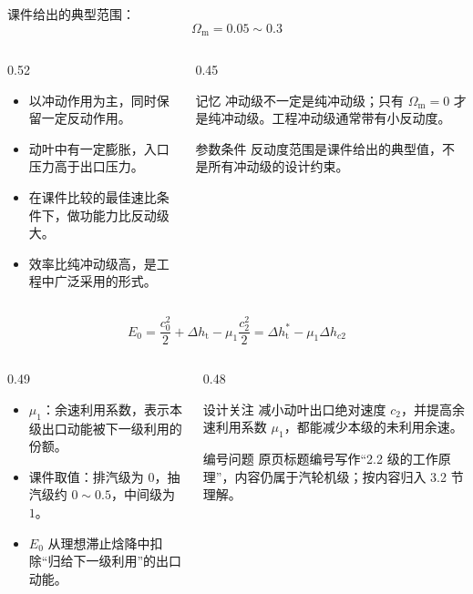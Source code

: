 \begin{frame}[t,shrink]{}
课件给出的典型范围：
$$
\Omega_{\mathrm{m}}=0.05\sim0.3
$$
\begin{columns}[T,onlytextwidth]
\begin{column}{0.52\textwidth}
  \begin{itemize}
    \item 以冲动作用为主，同时保留一定反动作用。
    \item 动叶中有一定膨胀，入口压力高于出口压力。
    \item 在课件比较的最佳速比条件下，做功能力比反动级大。
    \item 效率比纯冲动级高，是工程中广泛采用的形式。
  \end{itemize}
\end{column}
\begin{column}{0.45\textwidth}
  \begin{keybox}{记忆}
  \small 冲动级不一定是纯冲动级；只有 \(\Omega_{\mathrm{m}}=0\) 才是纯冲动级。工程冲动级通常带有小反动度。
  \end{keybox}
  \vspace{0.8mm}
  \begin{amberbox}{参数条件}
  \small 反动度范围是课件给出的典型值，不是所有冲动级的设计约束。
  \end{amberbox}
\end{column}
\end{columns}
\end{frame}

\begin{frame}[t,shrink]{}
$$
E_0
=\frac{c_0^2}{2}+\Delta h_{\mathrm{t}}
-\mu_1\frac{c_2^2}{2}
=\Delta h_{\mathrm{t}}^*-\mu_1\Delta h_{c2}
$$
\begin{columns}[T,onlytextwidth]
\begin{column}{0.49\textwidth}
  \begin{itemize}
    \item \(\mu_1\)：余速利用系数，表示本级出口动能被下一级利用的份额。
    \item 课件取值：排汽级为 \(0\)，抽汽级约 \(0\sim0.5\)，中间级为 \(1\)。
    \item \(E_0\) 从理想滞止焓降中扣除“归给下一级利用”的出口动能。
  \end{itemize}
\end{column}
\begin{column}{0.48\textwidth}
  \begin{keybox}{设计关注}
  \small 减小动叶出口绝对速度 \(c_2\)，并提高余速利用系数 \(\mu_1\)，都能减少本级的未利用余速。
  \end{keybox}
  \vspace{0.8mm}
  \begin{amberbox}{编号问题}
  \small 原页标题编号写作“2.2 级的工作原理”，内容仍属于汽轮机级；按内容归入 3.2 节理解。
  \end{amberbox}
\end{column}
\end{columns}
\end{frame}

